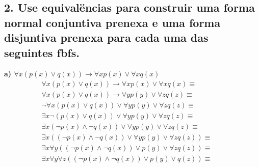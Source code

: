 \subsection*{2. Use equivalëncias para construir uma forma normal conjuntiva prenexa e uma forma disjuntiva prenexa para cada uma das seguintes fbfs.}

\textbf{a) $\forall x (p(x) \lor q(x)) \rightarrow \forall x p(x) \lor \forall x q(x) $} \\
\begin{align*}
\forall x (p(x) \lor q(x)) \rightarrow \forall x p(x) \lor \forall x q(x) \equiv \\
\forall x (p(x) \lor q(x)) \rightarrow \forall y p(y) \lor \forall z q(z) \equiv && \tag*{Renom.} \\
\lnot \forall x (p(x) \lor q(x)) \lor \forall y p(y) \lor \forall z q(z) \equiv && \tag*{Rem. $\rightarrow$} \\
\exists x \lnot (p(x) \lor q(x)) \lor \forall y p(y) \lor \forall z q(z) \equiv && \tag*{$\lnot \forall$} \\
\exists x (\lnot p(x) \land \lnot q(x)) \lor \forall y p(y) \lor \forall z q(z) \equiv && \tag*{$\lnot (A \lor B) \equiv \lnot A \land \lnot B $} \\
\exists x ((\lnot p(x) \land \lnot q(x)) \lor \forall y p(y) \lor \forall z q(z)) \equiv \\
\exists x \forall y ((\lnot p(x) \land \lnot q(x)) \lor p(y) \lor \forall z q(z)) \equiv \\
\exists x \forall y \forall z ((\lnot p(x) \land \lnot q(x)) \lor p(y) \lor q(z)) \equiv \\
\end{align*}
